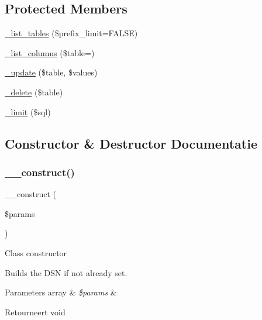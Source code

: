 \subsection*{Protected Members}
\begin{DoxyCompactItemize}
\item 
\mbox{\hyperlink{class_c_i___d_b__pdo__ibm__driver_a435c0f3ce54fe7daa178baa8532ebd54}{\+\_\+list\+\_\+tables}} (\$prefix\+\_\+limit=F\+A\+L\+SE)
\item 
\mbox{\hyperlink{class_c_i___d_b__pdo__ibm__driver_a7ccb7f9c301fe7f0a9db701254142b63}{\+\_\+list\+\_\+columns}} (\$table=\textquotesingle{}\textquotesingle{})
\item 
\mbox{\hyperlink{class_c_i___d_b__pdo__ibm__driver_a2540b03a93fa73ae74c10d0e16fc073e}{\+\_\+update}} (\$table, \$values)
\item 
\mbox{\hyperlink{class_c_i___d_b__pdo__ibm__driver_a133ea8446ded52589bd22cc9163d0896}{\+\_\+delete}} (\$table)
\item 
\mbox{\hyperlink{class_c_i___d_b__pdo__ibm__driver_a3a02ea06541b8ecc25a33a61651562c8}{\+\_\+limit}} (\$sql)
\end{DoxyCompactItemize}


\subsection{Constructor \& Destructor Documentatie}
\mbox{\label{class_c_i___d_b__pdo__ibm__driver_a9162320adff1a1a4afd7f2372f753a3e}} 
\subsubsection{\texorpdfstring{\_\_construct()}{\_\_construct()}}
{\footnotesize\ttfamily \+\_\+\+\_\+construct (\begin{DoxyParamCaption}\item[{}]{\$params }\end{DoxyParamCaption})}

Class constructor

Builds the D\+SN if not already set.


\begin{DoxyParams}[1]{Parameters}
array & {\em \$params} & \\
\hline
\end{DoxyParams}
\begin{DoxyReturn}{Retourneert}
void 
\end{DoxyReturn}


